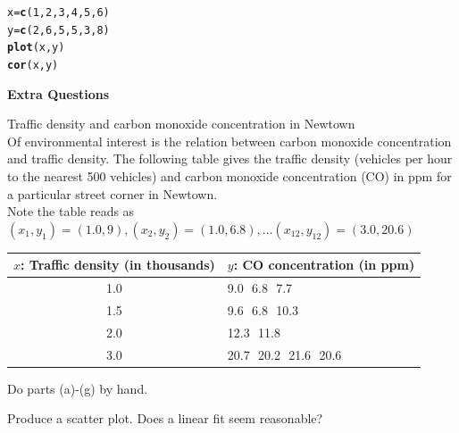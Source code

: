 \documentclass[bigtut]{tutorial}\usepackage[]{graphicx}\usepackage[]{color}
\makeatletter
\newcommand{\hlnum}[1]{\textcolor[rgb]{0.686,0.059,0.569}{#1}}%
\newcommand{\hlstd}[1]{\textcolor[rgb]{0.345,0.345,0.345}{#1}}%
\newcommand{\hlkwb}[1]{\textcolor[rgb]{0.69,0.353,0.396}{#1}}%
\newcommand{\hlkwd}[1]{\textcolor[rgb]{0.737,0.353,0.396}{\textbf{#1}}}%
\newenvironment{kframe}{%
 \def\at@end@of@kframe{}%
 \ifinner\ifhmode%
  \def\at@end@of@kframe{\end{minipage}}%
  \begin{minipage}{\columnwidth}%
 \fi\fi%
 \def\FrameCommand##1{\hskip\@totalleftmargin \hskip-\fboxsep
 \colorbox{shadecolor}{##1}\hskip-\fboxsep
     \hskip-\linewidth \hskip-\@totalleftmargin \hskip\columnwidth}%
 \MakeFramed {\advance\hsize-\width
   \@totalleftmargin\z@ \linewidth\hsize
   \@setminipage}}%
 {\par\unskip\endMakeFramed%
 \at@end@of@kframe}
\newenvironment{knitrout}{}{} %
\makeatother
\begin{document}
\begin{tutorial}
\begin{questions}
\begin{knitrout}
\color{fgcolor}\begin{kframe}
\begin{alltt}
\hlstd{x}\hlkwb{=}\hlkwd{c}\hlstd{(}\hlnum{1}\hlstd{,}\hlnum{2}\hlstd{,}\hlnum{3}\hlstd{,}\hlnum{4}\hlstd{,}\hlnum{5}\hlstd{,}\hlnum{6}\hlstd{)}
\hlstd{y}\hlkwb{=}\hlkwd{c}\hlstd{(}\hlnum{2}\hlstd{,}\hlnum{6}\hlstd{,}\hlnum{5}\hlstd{,}\hlnum{5}\hlstd{,}\hlnum{3}\hlstd{,}\hlnum{8}\hlstd{)}
\hlkwd{plot}\hlstd{(x,y)}
\hlkwd{cor}\hlstd{(x,y)}
\end{alltt}
\end{kframe}
\end{knitrout}












\newpage
\hspace{-1cm} {\bf Extra Questions}

\question Traffic density and carbon monoxide concentration in Newtown  \\

Of environmental interest is the relation between carbon monoxide concentration and  traffic density.  The following table gives the traffic density (vehicles per hour to the nearest 500 vehicles) and carbon monoxide concentration (CO) in ppm for a particular street corner in Newtown. \\
Note the table reads as $(x_1,y_1)=(1.0,9),(x_2,y_2)=(1.0,6.8),\ldots(x_{12},y_{12})=(3.0,20.6) $ 
\vskip 2mm
\begin{center}
\begin{tabular}{|c|l|}  \hline
$x$: Traffic density (in thousands)&$y$: CO concentration (in ppm)\\ \hline
1.0&\phantom{1}9.0\,\, \phantom{1}6.8\,\, \phantom{1}7.7 \\
 1.5&\phantom{1}9.6\,\, \phantom{1}6.8\,\, 10.3\\
2.0&12.3\,\, 11.8\\
3.0&20.7\,\, 20.2\,\, 21.6\,\, 20.6 \\ \hline
\end{tabular}
\end{center}
\vskip 1mm

\vspace{.5cm}
Do parts (a)-(g) by hand.
\begin{parts}
\item Produce a scatter plot. Does a linear fit seem reasonable? \\


\end{parts}
\end{questions}
\end{tutorial}
\end{document}
